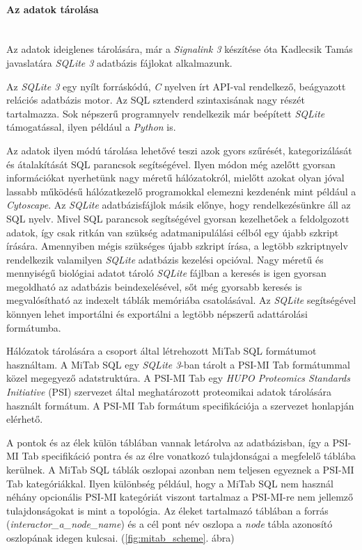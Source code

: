 \documentclass[a4paper,12pt]{article}
\begin{document}
			 	 


			\paragraph{Az adatok tárolása} \mbox{}\\
			Az adatok ideiglenes tárolására, már a \textit{Signalink 3} készítése óta Kadlecsik Tamás javaslatára \textit{SQLite 3} adatbázis fájlokat alkalmazunk. 
			
			
			Az \textit{SQLite 3} egy nyílt forráskódú, \textit{C} nyelven írt API-val rendelkező, beágyazott relációs adatbázis motor. Az SQL sztenderd szintaxisának nagy részét tartalmazza. Sok népszerű programnyelv rendelkezik már beépített \textit{SQLite} támogatással, ilyen például a \textit{Python} is. \cite{sqlite3}
			
			
			Az adatok ilyen módú tárolása lehetővé teszi azok gyors szűrését, kategorizálását és átalakítását SQL parancsok segítségével. Ilyen módon még azelőtt gyorsan információkat nyerhetünk nagy méretű hálózatokról, mielőtt azokat olyan jóval lassabb működésű hálózatkezelő programokkal elemezni kezdenénk mint például a \textit{Cytoscape}. Az \textit{SQLite} adatbázisfájlok másik előnye, hogy rendelkezésünkre áll az SQL nyelv. Mivel SQL parancsok segítségével gyorsan kezelhetőek a feldolgozott adatok, így csak ritkán van szükség adatmanipulálási célból egy újabb szkript írására. Amennyiben mégis szükséges újabb szkript írása, a legtöbb szkriptnyelv rendelkezik valamilyen \textit{SQLite} adatbázis kezelési opcióval. Nagy méretű és mennyiségű biológiai adatot tároló \textit{SQLite} fájlban a keresés is igen gyorsan megoldható az adatbázis beindexelésével, sőt még gyorsabb keresés is megvalósítható az indexelt táblák memóriába csatolásával. Az \textit{SQLite} segítségével könnyen lehet importálni és exportálni a legtöbb népszerű adattárolási formátumba. 

			
			Hálózatok tárolására a csoport által létrehozott MiTab SQL formátumot használtam. A MiTab SQL egy \textit{SQLite 3}-ban tárolt a PSI-MI Tab formátummal közel megegyező adatstruktúra. A PSI-MI Tab egy \textit{HUPO Proteomics Standards Initiative} (PSI) szervezet által meghatározott proteomikai adatok tárolására használt formátum. A PSI-MI Tab formátum specifikációja a szervezet honlapján elérhető. 
			
			A pontok és az élek külön táblában vannak letárolva az adatbázisban, így a PSI-MI Tab specifikáció pontra és az élre vonatkozó tulajdonságai a megfelelő táblába kerülnek. A MiTab SQL táblák oszlopai azonban nem teljesen egyeznek a PSI-MI Tab kategóriákkal. Ilyen különbség például, hogy a MiTab SQL nem használ néhány opcionális PSI-MI kategóriát viszont tartalmaz a PSI-MI-re nem jellemző tulajdonságokat is mint a topológia. Az éleket tartalmazó táblában a forrás (\textit{interactor\_a\_node\_name}) és a cél pont név oszlopa a \textit{node} tábla azonosító oszlopának idegen kulcsai. (\ref{fig:mitab_scheme}. ábra)
			
\end{document}
